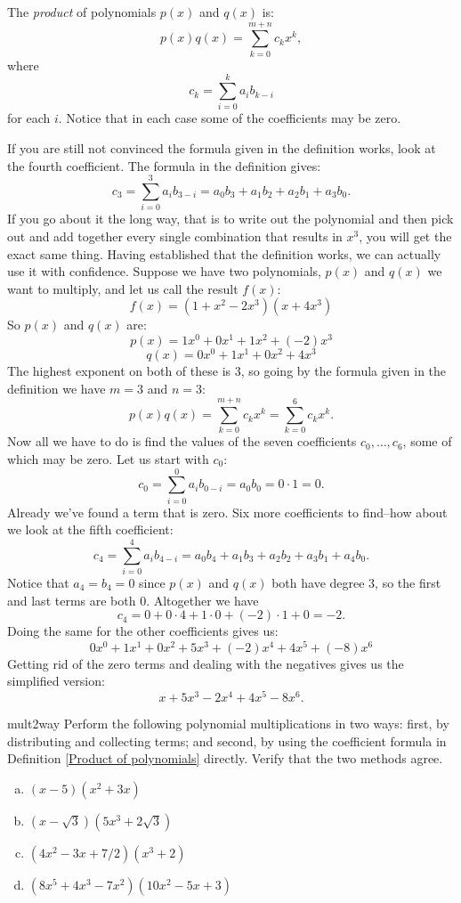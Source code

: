 \begin{defn}\label{Product of polynomials}

The \emph{product} of polynomials $p(x)$ and $q(x)$ is: 
\[
p(x) q(x) = \sum_{k=0}^{m+n} c_k x^k,
\]
where
\[
c_k=  \sum_{i = 0}^k a_i b_{k - i}
\]
for each $i$.  Notice that in each case some of the coefficients may be zero.
\end {defn}

If you are still not convinced the formula given in the definition works, look at the fourth coefficient.  The formula in the definition gives:
\[ c_3 = \sum_{i = 0}^3 a_i b_{3 - i} =  a_0b_3 + a_1b_2 +a_2b_1 + a_3b_0.  \]
If you go about it the long way, that is to write out the polynomial and then pick out and add together every single combination that results in $x^3$, you will get the exact same thing.  Having established that the definition works, we can actually use it with confidence.  Suppose we have two polynomials, $p(x)$ and $q(x)$ we want to multiply, and let us call the result $f(x)$:
\[ f(x)=(1+x^2-2x^3)(x+4x^3) \]
So $p(x)$ and $q(x)$ are:
\[p(x)= 1x^0 + 0x^1 + 1x^2 + (-2)x^3 \]
\[q(x)= 0x^0 + 1x^1 + 0x^2 + 4x^3 \]
The highest exponent on both of these is 3, so going by the formula given in the definition we have $m=3$ and $n=3$:
\[
p(x) q(x) = \sum_{k=0}^{m+n} c_k  x^k =  \sum_{k=0}^{6} c_k x^k. 
\]
Now all we have to do is find the values of the seven coefficients $c_0,\ldots,c_6$, some of which may be zero.  Let us start with $c_0$:
\[ c_0 = \sum_{i = 0}^0 a_i b_{0 - i} = a_0b_0= 0 \cdot 1 = 0. \]
Already we've found a term that is zero.  Six more coefficients to find--how about we look at the fifth coefficient:
\[ c_4 =  \sum_{i = 0}^4 a_i b_{4 - i} =   a_0b_4 + a_1b_3 +a_2b_2 + a_3b_1 + a_4b_0.\]
Notice that $a_4=b_4=0$ since $p(x)$ and $q(x)$ both have degree 3, so the first and last terms are both 0. Altogether we have 
\[ c_4=0+0\cdot 4+1\cdot 0+(-2)\cdot 1+0=-2.\]
Doing the same for the other coefficients gives us:
\[ 0x^0+ 1x^1 + 0x^2 + 5x^3 + (-2)x^4 + 4x^5 + (-8)x^6 \]
Getting rid of the zero terms and dealing with the negatives gives us the simplified version:
\[x+5x^3-2x^4+4x^5-8x^6. \]
\begin {exercise}{mult2way}
Perform the following polynomial multiplications in two ways: first, by distributing and collecting terms; and second, by using the coefficient formula in Definition \ref{Product of polynomials} directly.  Verify that the two methods agree.
\begin {enumerate}[(a)]
\item
$(x-5)(x^2+3x)$
\item
$(x-\sqrt{3})(5x^3+2\sqrt{3})$
\item
$(4x^2 - 3x + 7/2)(x^3+2)$
\item
$(8x^5 + 4x^3 - 7x^2)(10x^2 - 5x + 3)$
\end{enumerate}
\end {exercise}


